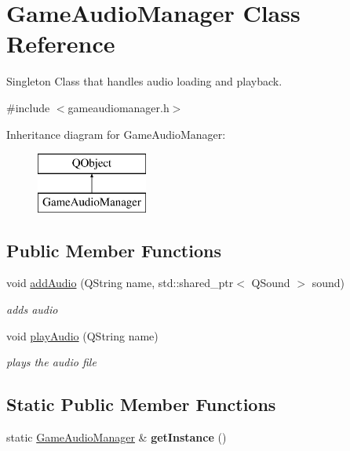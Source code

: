 \hypertarget{class_game_audio_manager}{\section{Game\-Audio\-Manager Class Reference}
\label{class_game_audio_manager}
}


Singleton Class that handles audio loading and playback.  




{\ttfamily \#include $<$gameaudiomanager.\-h$>$}

Inheritance diagram for Game\-Audio\-Manager\-:\begin{figure}[H]
\begin{center}
\leavevmode
\includegraphics[height=2.000000cm]{class_game_audio_manager}
\end{center}
\end{figure}
\subsection*{Public Member Functions}
\begin{DoxyCompactItemize}
\item 
void \hyperlink{class_game_audio_manager_ace62a41952c9c84d96ff604bb1170c44}{add\-Audio} (Q\-String name, std\-::shared\-\_\-ptr$<$ Q\-Sound $>$ sound)
\begin{DoxyCompactList}\small\item\em adds audio \end{DoxyCompactList}\item 
\hypertarget{class_game_audio_manager_a92a40349d9d48bdd0f9f8599db854cba}{void \hyperlink{class_game_audio_manager_a92a40349d9d48bdd0f9f8599db854cba}{play\-Audio} (Q\-String name)}\label{class_game_audio_manager_a92a40349d9d48bdd0f9f8599db854cba}

\begin{DoxyCompactList}\small\item\em plays the audio file \end{DoxyCompactList}\end{DoxyCompactItemize}
\subsection*{Static Public Member Functions}
\begin{DoxyCompactItemize}
\item 
\hypertarget{class_game_audio_manager_ac7c815f232bdf6fc59e9c79ea1379013}{static \hyperlink{class_game_audio_manager}{Game\-Audio\-Manager} \& {\bfseries get\-Instance} ()}\label{class_game_audio_manager_ac7c815f232bdf6fc59e9c79ea1379013}

\end{DoxyCompactItemize}


